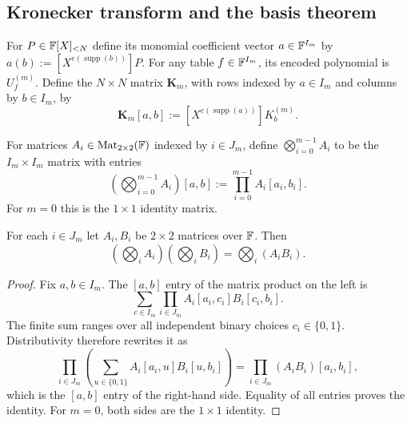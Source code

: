\subsection{Kronecker transform and the basis theorem}\label{sec:kbalgebra:matrix}

\begin{definition}\label{def:kbalgebra:coords}
For $P\in\mathbb{F}[X]_{<N}$ define its monomial coefficient vector $a\in\mathbb{F}^{I_m}$ by $a(b):=[X^{e(\operatorname{supp}(b))}]P$. For any table $f\in\mathbb{F}^{I_m}$, its encoded polynomial is $U_f^{(m)}$. Define the $N\times N$ matrix $\mathbf K_m$, with rows indexed by $a\in I_m$ and columns by $b\in I_m$, by
\[
 \mathbf K_m[a,b]:=[X^{e(\operatorname{supp}(a))}]K_b^{(m)}.
\]
\end{definition}

\begin{definition}\label{def:kbalgebra:tensor}
For matrices $A_i\in\operatorname{Mat}_{2\times2}(\mathbb{F})$ indexed by $i\in J_m$, define $\bigotimes_{i=0}^{m-1}A_i$ to be the $I_m\times I_m$ matrix with entries
\[
 \left(\bigotimes_{i=0}^{m-1}A_i\right)[a,b]
 :=\prod_{i=0}^{m-1}A_i[a_i,b_i].
\]
For $m=0$ this is the $1\times1$ identity matrix.
\end{definition}

\begin{lemma}\label{lem:kbalgebra:mixed-product}
For each $i\in J_m$ let $A_i,B_i$ be $2\times2$ matrices over $\mathbb{F}$. Then
\[
 \left(\bigotimes_i A_i\right)\left(\bigotimes_i B_i\right)
 =\bigotimes_i(A_iB_i).
\]
\end{lemma}
\begin{proof}
Fix $a,b\in I_m$. The $[a,b]$ entry of the matrix product on the left is
\[
 \sum_{c\in I_m}\prod_{i\in J_m}A_i[a_i,c_i]B_i[c_i,b_i].
\]
The finite sum ranges over all independent binary choices $c_i\in\{0,1\}$. Distributivity therefore rewrites it as
\[
 \prod_{i\in J_m}\left(\sum_{u\in\{0,1\}}A_i[a_i,u]B_i[u,b_i]\right)
 =\prod_{i\in J_m}(A_iB_i)[a_i,b_i],
\]
which is the $[a,b]$ entry of the right-hand side. Equality of all entries proves the identity. For $m=0$, both sides are the $1\times1$ identity.
\end{proof}

